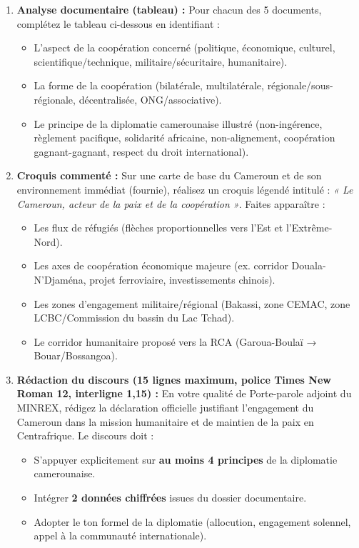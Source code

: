\documentclass[11pt]{article}
\newcommand{\cle}[1]{{\popxbold\color{popdark}#1}}
\begin{document}
\begin{enumerate}
    \item \textbf{Analyse documentaire (tableau) :} Pour chacun des 5 documents, complétez le tableau ci-dessous en identifiant :
    \begin{itemize}
        \item L'\cle{aspect} de la coopération concerné (politique, économique, culturel, scientifique/technique, militaire/sécuritaire, humanitaire).
        \item La \cle{forme} de la coopération (bilatérale, multilatérale, régionale/sous-régionale, décentralisée, ONG/associative).
        \item Le \cle{principe de la diplomatie camerounaise} illustré (non-ingérence, règlement pacifique, solidarité africaine, non-alignement, coopération gagnant-gagnant, respect du droit international).
    \end{itemize}
    
    \item \textbf{Croquis commenté :} Sur une carte de base du Cameroun et de son environnement immédiat (fournie), réalisez un croquis légendé intitulé : \emph{« Le Cameroun, acteur de la paix et de la coopération »}. Faites apparaître :
    \begin{itemize}
        \item Les flux de réfugiés (flèches proportionnelles vers l'Est et l'Extrême-Nord).
        \item Les axes de coopération économique majeure (ex. corridor Douala-N'Djaména, projet ferroviaire, investissements chinois).
        \item Les zones d'engagement militaire/régional (Bakassi, zone CEMAC, zone LCBC/Commission du bassin du Lac Tchad).
        \item Le corridor humanitaire proposé vers la RCA (Garoua-Boulaï → Bouar/Bossangoa).
    \end{itemize}
    
    \item \textbf{Rédaction du discours (15 lignes maximum, police Times New Roman 12, interligne 1,15) :} En votre qualité de Porte-parole adjoint du MINREX, rédigez la déclaration officielle justifiant l'engagement du Cameroun dans la mission humanitaire et de maintien de la paix en Centrafrique. Le discours doit :
    \begin{itemize}
        \item S'appuyer explicitement sur \textbf{au moins 4 principes} de la diplomatie camerounaise.
        \item Intégrer \textbf{2 données chiffrées} issues du dossier documentaire.
        \item Adopter le ton formel de la diplomatie (allocution, engagement solennel, appel à la communauté internationale).
    \end{itemize}
\end{enumerate}
\end{document}
